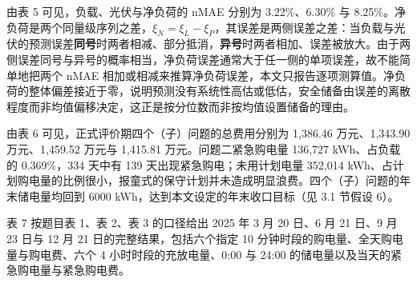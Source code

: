 \documentclass[12pt,a4paper]{ctexart}
\begin{document}
由表 5 可见，负载、光伏与净负荷的 nMAE 分别为 3.22\%、6.30\% 与 8.25\%。净负荷是两个同量级序列之差，$\xi_{N}=\xi_{L}-\xi_{P}$，其误差是两侧误差之差：当负载与光伏的预测误差\textbf{同号}时两者相减、部分抵消，\textbf{异号}时两者相加、误差被放大。由于两侧误差同号与异号的概率相当，净负荷误差通常大于任一侧的单项误差，故不能简单地把两个 nMAE 相加或相减来推算净负荷误差，本文只报告逐项测算值。净负荷的整体偏差接近于零，说明预测没有系统性高估或低估，安全储备由误差的离散程度而非均值偏移决定，这正是按分位数而非按均值设置储备的理由。

由表 6 可见，正式评价期四个（子）问题的总费用分别为 1,386.46 万元、1,343.90 万元、1,459.52 万元与 1,415.81 万元。问题二紧急购电量 136,727 kWh、占负载的 0.369\%，334 天中有 139 天出现紧急购电；未用计划电量 352,014 kWh、占计划购电量的比例很小，报童式的保守计划并未造成明显浪费。四个（子）问题的年末储电量均回到 6000 kWh，达到本文设定的年末收口目标（见 3.1 节假设 6）。

表 7 按题目表 1、表 2、表 3 的口径给出 2025 年 3 月 20 日、6 月 21 日、9 月 23 日与 12 月 21 日的完整结果，包括六个指定 10 分钟时段的购电量、全天购电量与购电费、六个 4 小时时段的充放电量、0:00 与 24:00 的储电量以及当天的紧急购电量与紧急购电费。
\end{document}

